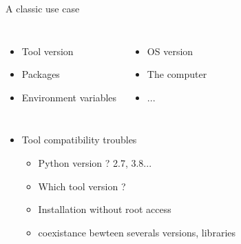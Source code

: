\begin{frame}{A classic use case}
\begin{columns}
\begin{itemize}
	\item Tool version
	\item Packages
	\item Environment variables
\end{itemize}
\begin{itemize}
	\item OS version
	\item The computer 
	\item ...
\end{itemize}
\end{columns}
\end{frame}

\begin{frame}
\begin{itemize}
\item Tool compatibility troubles
	\begin{itemize}
	\item Python version ? 2.7, 3.8...
	\item Which tool version ?
	\item Installation without root access
	\item coexistance bewteen severals versions, libraries
	\end{itemize}
\end{itemize}
\end{frame}

